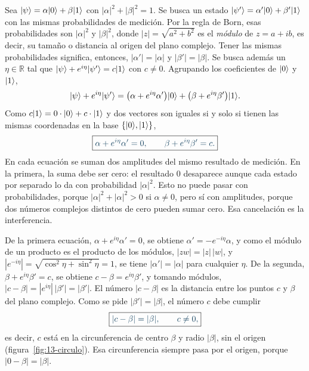 Sea $\lvert \psi\rangle=\alpha\lvert 0\rangle+\beta\lvert 1\rangle$ con $|\alpha|^2+|\beta|^2=1$. Se busca un estado
$\lvert \psi'\rangle=\alpha'\lvert 0\rangle+\beta'\lvert 1\rangle$ con las mismas probabilidades de medición. Por la regla de Born, esas probabilidades son $|\alpha|^2$ y $|\beta|^2$, donde $|z|=\sqrt{a^2+b^2}$ es el \emph{módulo} de $z=a+ib$, es decir, su tamaño o distancia al origen del plano complejo. Tener las mismas probabilidades significa, entonces,
$|\alpha'|=|\alpha|$ y $|\beta'|=|\beta|$. Se busca además un $\eta\in\mathbb{R}$ tal que
$\lvert \psi\rangle+e^{i\eta}\lvert \psi'\rangle=c\lvert 1\rangle$ con $c\neq0$. Agrupando los coeficientes de $\lvert 0\rangle$ y
$\lvert 1\rangle$,
\begin{equation}\label{eq:13-suma}
  \lvert \psi\rangle+e^{i\eta}\lvert \psi'\rangle
  =\bigl(\alpha+e^{i\eta}\alpha'\bigr)\lvert 0\rangle+\bigl(\beta+e^{i\eta}\beta'\bigr)\lvert 1\rangle.
\end{equation}
Como $c\lvert 1\rangle=0\cdot\lvert 0\rangle+c\cdot\lvert 1\rangle$ y dos vectores son iguales si y solo si tienen las mismas
coordenadas en la base $\{\lvert 0\rangle,\lvert 1\rangle\}$,
\begin{equation}\label{eq:13-sistema}
  \destacado{\alpha+e^{i\eta}\alpha'=0,\qquad \beta+e^{i\eta}\beta'=c.}
\end{equation}
En cada ecuación se suman dos amplitudes del mismo resultado de medición. En la primera, la suma
debe ser cero: el resultado $0$ desaparece aunque cada estado por separado lo da con probabilidad
$|\alpha|^2$. Esto no puede pasar con probabilidades, porque $|\alpha|^2+|\alpha|^2>0$ si
$\alpha\neq0$, pero sí con amplitudes, porque dos números complejos distintos de cero pueden
sumar cero. Esa cancelación es la interferencia.

De la primera ecuación, $\alpha+e^{i\eta}\alpha'=0$, se obtiene $\alpha'=-e^{-i\eta}\alpha$, y
como el módulo de un producto es el producto de los módulos, $|zw|=|z|\,|w|$, y $|e^{-i\eta}|=\sqrt{\cos^2\eta+\sin^2\eta}=1$, se tiene $|\alpha'|=|\alpha|$ para cualquier $\eta$. De la segunda,
$\beta+e^{i\eta}\beta'=c$, se obtiene $c-\beta=e^{i\eta}\beta'$, y tomando módulos,
$|c-\beta|=|e^{i\eta}|\,|\beta'|=|\beta'|$. El número $|c-\beta|$ es la distancia entre los puntos $c$ y $\beta$ del plano complejo. Como se pide $|\beta'|=|\beta|$, el número $c$ debe cumplir
\begin{equation}\label{eq:13-circulo}
  \destacado{|c-\beta|=|\beta|,\qquad c\neq 0,}
\end{equation}
es decir, $c$ está en la circunferencia de centro $\beta$ y radio $|\beta|$, sin el origen
(figura~\ref{fig:13-circulo}). Esa circunferencia siempre pasa por el origen, porque
$|0-\beta|=|\beta|$.

